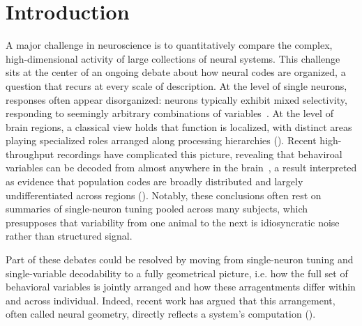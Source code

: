 \section{Introduction}

A major challenge in neuroscience is to quantitatively compare the complex, high-dimensional activity of large collections of neural systems. This challenge sits at the center of an ongoing debate about how neural codes are organized, a question that recurs at every scale of description. At the level of single neurons, responses often appear disorganized: neurons typically exhibit mixed selectivity, responding to seemingly arbitrary combinations of variables~\parencite{rigotti2013,tye2024,ostojic2024,posani2026}. At the level of brain regions, a classical view holds that function is localized, with distinct areas playing specialized roles arranged along processing hierarchies (\cite{petersen2024principles}). Recent high-throughput recordings have complicated this picture, revealing that behaviroal variables can be decoded from almost anywhere in the brain~\parencite{steinmetz2019distributed,stringer2019spontaneous,musall2019, findling2025brain,angelaki2025brain,rosen2026distributed,schartner2025, bondy2025,posani2026}, a result interpreted as evidence that population codes are broadly distributed and largely undifferentiated across regions (\textcite{hayden2026rethinking,fine2021whole,Lloreda2025}). Notably, these conclusions often rest on summaries of single-neuron tuning pooled
across many subjects, which presupposes that variability from one animal to the next is idiosyncratic noise rather than structured signal. 

Part of these debates could be resolved by moving from single-neuron tuning and single-variable decodability to a fully geometrical picture, i.e. how the full set of behavioral variables is jointly arranged and how these arragentments differ within and across individual. Indeed, recent work has argued that this arrangement, often called neural geometry, directly reflects a system's computation (\cite{courellis2024,nogueira2026, fascianelli2024neural, pagan2025}).

